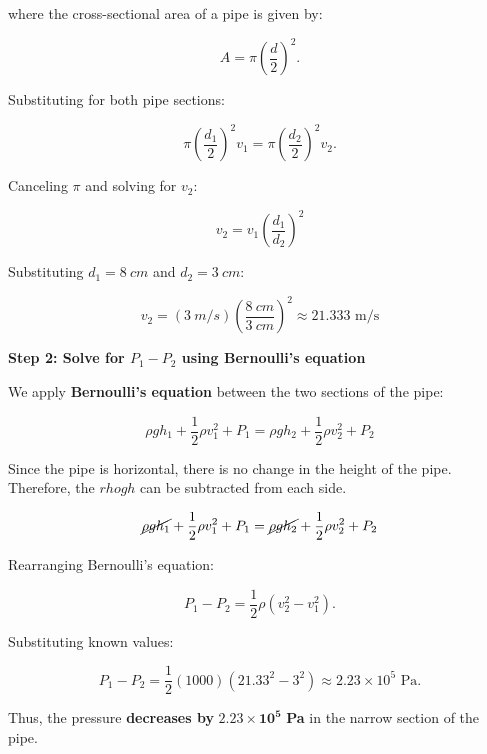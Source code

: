 \begin{mdframed}[backgroundcolor=blue!10!white]
	where the cross-sectional area of a pipe is given by:
	
	\begin{equation*}
		A = \pi \left(\frac{d}{2} \right)^2.
	\end{equation*}
	
	Substituting for both pipe sections:
	
	\begin{equation*}
		\pi \left(\frac{d_1}{2} \right)^2 v_1 = \pi \left(\frac{d_2}{2} \right)^2 v_2.
	\end{equation*}
	
	Canceling \( \pi \) and solving for \( v_2 \):
	
	\begin{equation*}
		v_2 = v_1 \left( \frac{d_1}{d_2} \right)^2
	\end{equation*}
	
	Substituting \( d_1 = \SI{8}{cm} \) and \( d_2 = \SI{3}{cm} \):
	
	\begin{equation*}
		v_2 = (\SI{3}{m/s}) \left( \frac{\SI{8}{cm}}{\SI{3}{cm}} \right)^2  \approx 21.333 \text{ m/s}
	\end{equation*}
	

	
	\textbf{Step 2: Solve for \( P_1 - P_2 \) using Bernoulli’s equation}  
	
	We apply \textbf{Bernoulli’s equation} between the two sections of the pipe:
	
	\begin{equation*}
		 \rho g h_1 +  \frac{1}{2} \rho v_1^2 + P_1 =  \rho g h_2 + \frac{1}{2} \rho v_2^2 + P_2 
	\end{equation*}
	
	Since the pipe is horizontal, there is no change in the height of the pipe.  Therefore, the $rho g h$ can be subtracted from each side.
	
		\begin{equation*}
		\cancel{\rho g h_1} +  \frac{1}{2} \rho v_1^2 +  P_1 =  \cancel{\rho g h_2 }+ \frac{1}{2} \rho v_2^2 + P_2 
	\end{equation*}
	
	
	
	
	
	Rearranging Bernoulli’s equation:
	
	\begin{equation*}
		P_1 - P_2 = \frac{1}{2} \rho \left(v_2^2 - v_1^2 \right).
	\end{equation*}
	
	Substituting known values:
	
	\begin{equation*}
		P_1 - P_2 = \frac{1}{2} (1000) \left( 21.33^2 - 3^2 \right) \approx 2.23 \times 10^5 \text{ Pa}.
	\end{equation*}
	
	Thus, the pressure \textbf{decreases by} \( \mathbf{2.23 \times 10^5} \) \textbf{Pa} in the narrow section of the pipe.
	

	
\end{mdframed}
\vspace{0.1in}

